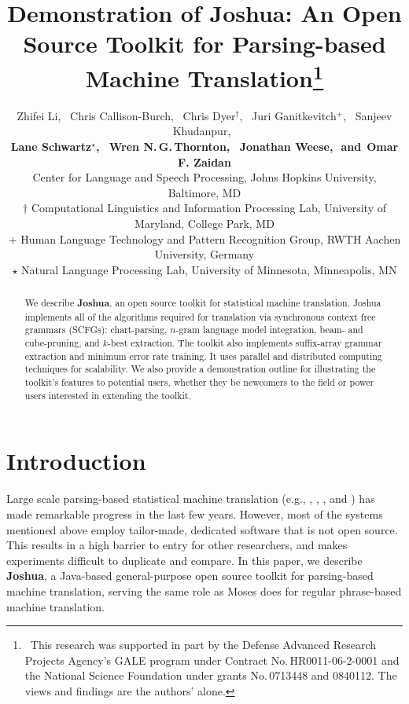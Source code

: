 \documentclass[11pt]{article}
\title{Demonstration of Joshua: An Open Source Toolkit for Parsing-based Machine Translation\thanks{$\;\:$This research was supported in part by the Defense Advanced Research Projects Agency's GALE program under Contract No.\,HR0011-06-2-0001 and the National Science Foundation under grants No.\,0713448 and 0840112. The views and findings are the authors' alone.
}}
\author{
Zhifei Li,\,\,\,
Chris Callison-Burch,\,\,\, %
Chris Dyer$^\dagger$,\,\,\,
Juri Ganitkevitch$^+$,\,\,\,
Sanjeev Khudanpur,\,\,\, \\
{\bf Lane Schwartz$^\star$,\,\,\,
Wren N.\,G.\,Thornton,\,\,\,
Jonathan Weese,\,\,
{\textnormal{and}}\,\,\,Omar F. Zaidan}\\
Center for Language and Speech Processing, Johns Hopkins University, Baltimore, MD\\
$\dagger$ Computational Linguistics and Information Processing Lab, University of Maryland, College Park, MD\\
$+$ Human Language Technology and Pattern Recognition Group, RWTH Aachen University, Germany\\
$\star$ Natural Language Processing Lab, University of Minnesota, Minneapolis, MN }
\date{}
\begin{document}
\maketitle


\begin{abstract}

We describe \textbf{Joshua}, an open source toolkit for statistical machine translation. Joshua implements all of the algorithms required for translation via synchronous context free grammars (SCFGs): chart-parsing, $n$-gram language model integration, beam- and cube-pruning, and $k$-best extraction. The toolkit also implements suffix-array grammar extraction and minimum error rate training. It uses parallel and distributed computing techniques for scalability. We also provide a demonstration outline for illustrating the toolkit's features to potential users, whether they be newcomers to the field or power users interested in extending the toolkit.

\end{abstract}


\section{Introduction}

Large scale parsing-based statistical machine translation (e.g., , , , and ) has made remarkable progress in the last few years.
However, most of the systems mentioned above employ tailor-made, dedicated software that is not open source.  This results in a high barrier to entry for other researchers, and makes experiments difficult to duplicate and compare.
In this paper, we describe \textbf{Joshua}, a Java-based general-purpose open source toolkit for parsing-based machine translation, serving the same role as Moses \cite{Moses} does for regular phrase-based machine translation.

\end{document}
